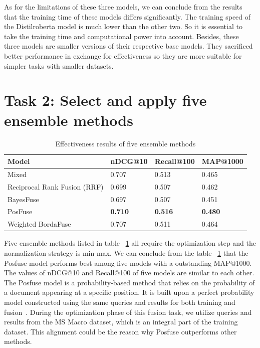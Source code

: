 \documentclass[acmsmall]{acmart}
\begin{document}
As for the limitations of these three models, we can conclude from the results that the training time of these models differs significantly. The training speed of the Distilroberta model is much lower than the other two. So it is essential to take the training time and computational power into account. Besides, these three models are smaller versions of their respective base models. They sacrificed better performance in exchange for effectiveness so they are more suitable for simpler tasks with smaller datasets.
\section{Task 2: Select and apply five ensemble methods}
\begin{table}[!ht]
    \centering
    \caption{Effectiveness results of five ensemble methods}
    \label{tab:results-task2}
    \begin{tabular}{llll}
       \toprule
       \textbf{Model} &  \textbf{nDCG@10} & \textbf{Recall@100} & \textbf{MAP@1000}\\
       \midrule
       Mixed & 0.707 & 0.513 & 0.465\\
       Reciprocal Rank Fusion (RRF) & 0.699 & 0.507 & 0.462\\
       BayesFuse & 0.697 & 0.507 & 0.451\\
       PosFuse & \textbf{0.710} & \textbf{0.516} & \textbf{0.480}\\
       Weighted BordaFuse & 0.707 & 0.511 & 0.464\\
       \bottomrule
    \end{tabular}
\end{table}
Five ensemble methods listed in table ~\ref{tab:results-task2} all require the optimization step and the normalization strategy is min-max. We can conclude from the table ~\ref{tab:results-task2} that the Posfuse model performs best among five models with a outstanding MAP@1000. The values of nDCG@10 and Recall@100 of five models are similar to each other. The Posfuse model is a probability-based method that relies on the probability of a document appearing at a specific position. It is built upon a perfect probability model constructed using the same queries and results for both training and fusion~\cite{DBLP:conf/sigir/LillisZTCLD10}. During the optimization phase of this fusion task, we utilize queries and results from the MS Macro dataset, which is an integral part of the training dataset. This alignment could be the reason why Posfuse outperforms other methods.
\end{document}
